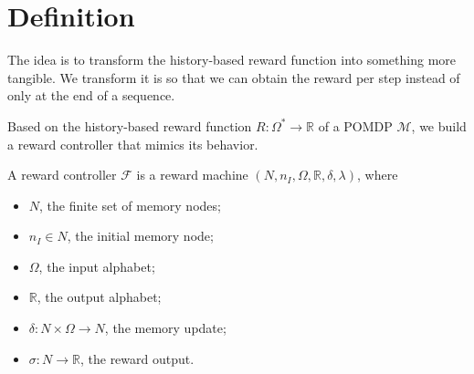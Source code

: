 \section{Definition}


The idea is to transform the history-based reward function into something more tangible. We transform it is so that we can obtain the reward per step instead of only at the end of a sequence.


Based on the history-based reward function $R:\Omega^*\to\mathbb{R}$ of a POMDP $\mathcal{M}$, we build a reward controller that mimics its behavior.



\begin{definition}
	A reward controller $\mathcal{F}$ is a reward machine $(N,n_I, \Omega, \mathbb{R}, \delta, \lambda)$, where
	\begin{itemize}
		\item $N$, the finite set of memory nodes;
		\item $n_I\in N$, the initial memory node;
		\item $\Omega$, the input alphabet;
		\item $\mathbb{R}$, the output alphabet;
		\item $\delta: N \times \Omega \to N$, the memory update;
		\item $\sigma: N \to \mathbb{R}$, the reward output. 
	\end{itemize}
\end{definition}


